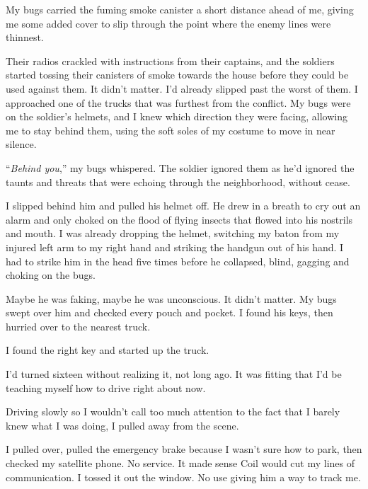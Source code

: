 My bugs carried the fuming smoke canister a short distance ahead of me, giving me some added cover to slip through the point where the enemy lines were thinnest.



Their radios crackled with instructions from their captains, and the soldiers started tossing their canisters of smoke towards the house before they could be used against them.  It didn't matter.  I'd already slipped past the worst of them.  I approached one of the trucks that was furthest from the conflict.  My bugs were on the soldier's helmets, and I knew which direction they were facing, allowing me to stay behind them, using the soft soles of my costume to move in near silence.



``\emph{Behind you},'' my bugs whispered.  The soldier ignored them as he'd ignored the taunts and threats that were echoing through the neighborhood, without cease.



I slipped behind him and pulled his helmet off.  He drew in a breath to cry out an alarm and only choked on the flood of flying insects that flowed into his nostrils and mouth.  I was already dropping the helmet, switching my baton from my injured left arm to my right hand and striking the handgun out of his hand.  I had to strike him in the head five times before he collapsed, blind, gagging and choking on the bugs.



Maybe he was faking, maybe he was unconscious.  It didn't matter.  My bugs swept over him and checked every pouch and pocket.  I found his keys, then hurried over to the nearest truck.



I found the right key and started up the truck.



I'd turned sixteen without realizing it, not long ago.  It was fitting that I'd be teaching myself how to drive right about now.



Driving slowly so I wouldn't call too much attention to the fact that I barely knew what I was doing, I pulled away from the scene.



\blacksquare



I pulled over, pulled the emergency brake because I wasn't sure how to park, then checked my satellite phone.  No service.  It made sense Coil would cut my lines of communication.  I tossed it out the window.  No use giving him a way to track me.



